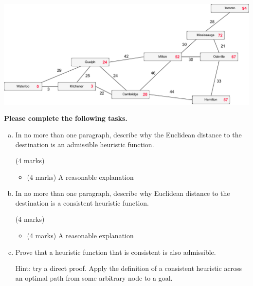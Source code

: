 \documentclass[12pt]{article}
\begin{document}
\includegraphics[width=\textwidth]{images_posted/Heuristic_map.pdf}



{\bf Please complete the following tasks.}

\begin{enumerate}[(a)]


\item
\label{heuristic}
In no more than one paragraph, describe why the Euclidean distance to the destination is an admissible heuristic function.

\begin{markscheme}
(4 marks)

\begin{itemize}
\item
(4 marks) A reasonable explanation
\end{itemize}

\end{markscheme}

\item
\label{heuristic}
In no more than one paragraph, describe why Euclidean distance to the destination is a consistent heuristic function.

\begin{markscheme}
(4 marks)

\begin{itemize}
\item
(4 marks) A reasonable explanation
\end{itemize}

\end{markscheme}

\item
\label{heuristic}
Prove that a heuristic function that is consistent is also admissible.

Hint: try a direct proof. Apply the definition of a consistent heuristic across an optimal path from some arbitrary node to a goal.  %


\end{enumerate}
\end{document}
